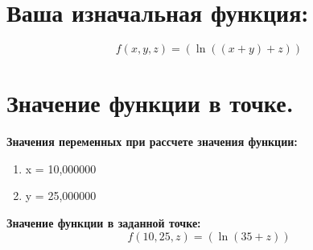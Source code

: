 \documentclass[12pt,a4paper]{scrartcl}
\begin{document}
\section{Ваша изначальная функция:} 
 \begin{equation} f(x, y, z) = {(\ln{({({x}+{y})}+{z})})}\end{equation}
\section{Значение функции в точке.}
\noindent \textbf {Значения переменных при рассчете значения функции:}
\begin{enumerate}
	\item x = 10,000000
	\item y = 25,000000
\end{enumerate}
\noindent \textbf {Значение функции в заданной точке:}
 \begin{equation} f(10, 25, z) = {(\ln{({35}+{z})})}\end{equation}
\end{document}
